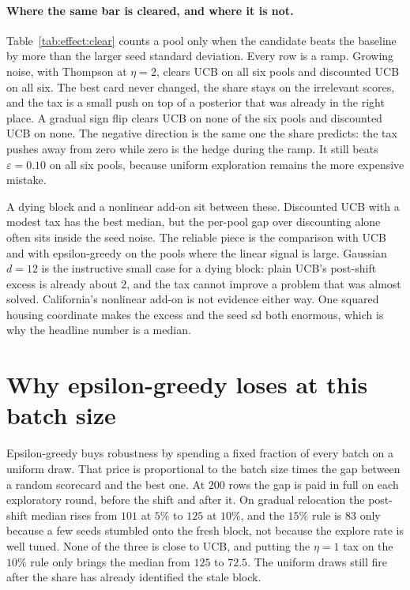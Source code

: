 \documentclass[11pt]{article}
\begin{document}
\paragraph{Where the same bar is cleared, and where it is not.}
Table~\ref{tab:effect:clear} counts a pool only when the candidate beats the baseline by more than the larger seed standard deviation.
Every row is a ramp.
Growing noise, with Thompson at \(\eta=2\), clears UCB on all six pools and discounted UCB on all six.
The best card never changed, the share stays on the irrelevant scores, and the tax is a small push on top of a posterior that was already in the right place.
A gradual sign flip clears UCB on none of the six pools and discounted UCB on none.
The negative direction is the same one the share predicts: the tax pushes away from zero while zero is the hedge during the ramp.
It still beats \(\varepsilon=0.10\) on all six pools, because uniform exploration remains the more expensive mistake.

A dying block and a nonlinear add-on sit between these.
Discounted UCB with a modest tax has the best median, but the per-pool gap over discounting alone often sits inside the seed noise.
The reliable piece is the comparison with UCB and with epsilon-greedy on the pools where the linear signal is large.
Gaussian \(d=12\) is the instructive small case for a dying block: plain UCB's post-shift excess is already about \(2\), and the tax cannot improve a problem that was almost solved.
California's nonlinear add-on is not evidence either way.
One squared housing coordinate makes the excess and the seed sd both enormous, which is why the headline number is a median.



\section{Why epsilon-greedy loses at this batch size}

Epsilon-greedy buys robustness by spending a fixed fraction of every batch on a uniform draw.
That price is proportional to the batch size times the gap between a random scorecard and the best one.
At \(200\) rows the gap is paid in full on each exploratory round, before the shift and after it.
On gradual relocation the post-shift median rises from \(101\) at \(5\%\) to \(125\) at \(10\%\), and the \(15\%\) rule is \(83\) only because a few seeds stumbled onto the fresh block, not because the explore rate is well tuned.
None of the three is close to UCB, and putting the \(\eta=1\) tax on the \(10\%\) rule only brings the median from \(125\) to \(72.5\).
The uniform draws still fire after the share has already identified the stale block.
\end{document}
